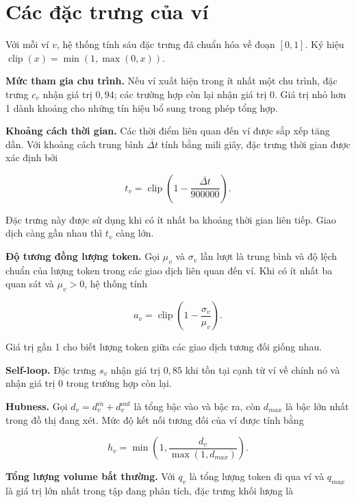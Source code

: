 \section{Các đặc trưng của ví}

Với mỗi ví $v$, hệ thống tính sáu đặc trưng đã chuẩn hóa về đoạn $[0,1]$. Ký hiệu $\operatorname{clip}(x)=\min(1,\max(0,x))$.

\textbf{Mức tham gia chu trình.} Nếu ví xuất hiện trong ít nhất một chu trình, đặc trưng $c_v$ nhận giá trị $0{,}94$; các trường hợp còn lại nhận giá trị 0. Giá trị nhỏ hơn 1 dành khoảng cho những tín hiệu bổ sung trong phép tổng hợp.

\textbf{Khoảng cách thời gian.} Các thời điểm liên quan đến ví được sắp xếp tăng dần. Với khoảng cách trung bình $\overline{\Delta t}$ tính bằng mili giây, đặc trưng thời gian được xác định bởi

\begin{equation}
t_v=\operatorname{clip}\left(1-\frac{\overline{\Delta t}}{900000}\right).
\end{equation}

Đặc trưng này được sử dụng khi có ít nhất ba khoảng thời gian liên tiếp. Giao dịch càng gần nhau thì $t_v$ càng lớn.

\textbf{Độ tương đồng lượng token.} Gọi $\mu_v$ và $\sigma_v$ lần lượt là trung bình và độ lệch chuẩn của lượng token trong các giao dịch liên quan đến ví. Khi có ít nhất ba quan sát và $\mu_v>0$, hệ thống tính

\begin{equation}
a_v=\operatorname{clip}\left(1-\frac{\sigma_v}{\mu_v}\right).
\end{equation}

Giá trị gần 1 cho biết lượng token giữa các giao dịch tương đối giống nhau.

\textbf{Self-loop.} Đặc trưng $s_v$ nhận giá trị $0{,}85$ khi tồn tại cạnh từ ví về chính nó và nhận giá trị 0 trong trường hợp còn lại.

\textbf{Hubness.} Gọi $d_v=d_v^{in}+d_v^{out}$ là tổng bậc vào và bậc ra, còn $d_{max}$ là bậc lớn nhất trong đồ thị đang xét. Mức độ kết nối tương đối của ví được tính bằng

\begin{equation}
h_v=\min\left(1,\frac{d_v}{\max(1,d_{max})}\right).
\end{equation}

\textbf{Tổng lượng volume bất thường.} Với $q_v$ là tổng lượng token đi qua ví và $q_{max}$ là giá trị lớn nhất trong tập đang phân tích, đặc trưng khối lượng là

